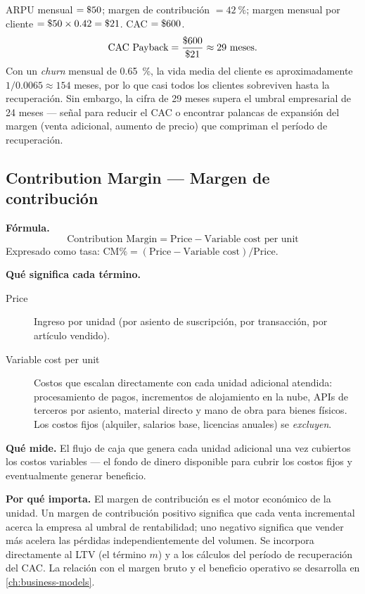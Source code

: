 \begin{example}
ARPU mensual $= \$\num{50}$; margen de contribución $= \qty{42}{\percent}$; margen mensual
por cliente $= \$\num{50} \times 0.42 = \$\num{21}$. CAC $= \$\num{600}$.
\[
  \text{CAC Payback} = \frac{\$\num{600}}{\$\num{21}} \approx 29 \text{ meses}.
\]
Con un \emph{churn} mensual de \qty{0.65}{\percent}, la vida media del cliente es
aproximadamente $1/0.0065 \approx 154$ meses, por lo que casi todos los clientes sobreviven
hasta la recuperación. Sin embargo, la cifra de 29 meses supera el umbral empresarial de
24 meses --- señal para reducir el CAC o encontrar palancas de expansión del margen
(venta adicional, aumento de precio) que compriman el período de recuperación.
\end{example}


\subsection{Contribution Margin --- Margen de contribución}

\textbf{Fórmula.}
\[
  \text{Contribution Margin} = \text{Price} - \text{Variable cost per unit}
\]
Expresado como tasa: $\text{CM\%} = (\text{Price} - \text{Variable cost})/\text{Price}$.

\textbf{Qué significa cada término.}
\begin{description}
  \item[Price] Ingreso por unidad (por asiento de suscripción, por transacción, por artículo
    vendido).
  \item[Variable cost per unit] Costos que escalan directamente con cada unidad adicional
    atendida: procesamiento de pagos, incrementos de alojamiento en la nube, APIs de terceros
    por asiento, material directo y mano de obra para bienes físicos. Los costos fijos
    (alquiler, salarios base, licencias anuales) se \emph{excluyen}.
\end{description}

\textbf{Qué mide.} El flujo de caja que genera cada unidad adicional una vez cubiertos los
costos variables --- el fondo de dinero disponible para cubrir los costos fijos y
eventualmente generar beneficio.

\textbf{Por qué importa.} El margen de contribución es el motor económico de la unidad. Un
margen de contribución positivo significa que cada venta incremental acerca la empresa al
umbral de rentabilidad; uno negativo significa que vender más acelera las pérdidas
independientemente del volumen. Se incorpora directamente al LTV (el término $m$) y a los
cálculos del período de recuperación del CAC. La relación con el margen bruto y el beneficio
operativo se desarrolla en \cref{ch:business-models}.

